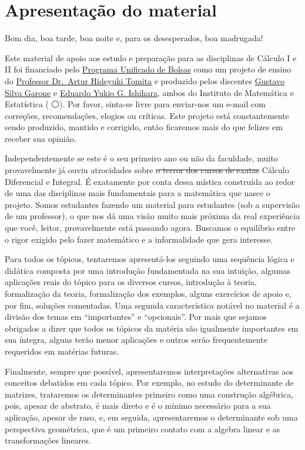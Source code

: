 \documentclass[
  portuguese,
  letterpaper,
  DIV=11,
  numbers=noendperiod]{scrreport}
\begin{document}
\section{Apresentação do material}\label{apresentauxe7uxe3o-do-material}

Bom dia, boa tarde, boa noite e, para os desesperados, boa madrugada! 👋

Este material de apoio aos estudo e preparação para as disciplinas de
Cálculo I e II foi financiado pelo
\href{https://prip.usp.br/pub/}{Programa Unificado de Bolsas} como um
projeto de ensino do \href{https://www.ime.usp.br/~tomita/}{Professor
Dr.~Artur Hideyuki Tomita} e produzido pelos discentes
\href{gustavo.garone@usp.br}{Gustavo Silva Garone} e
\href{eduardoyukio.ishihara@usp.br}{Eduardo Yukio G. Ishihara}, ambos do
Instituto de Matemática e Estatística (🔴⚪). Por favor, sinta-se livre
para enviar-nos um e-mail com correções, recomendações, elogios ou
críticas. Este projeto está constantemente sendo produzido, mantido e
corrigido, então ficaremos mais do que felizes em receber sua opinião.

Independentemente se este é o seu primeiro ano ou não da faculdade,
muito provavelmente já ouviu atrocidades sobre \st{o terror dos cursos
de exatas} Cálculo Diferencial e Integral. É exatamente por conta dessa
mística construída ao redor de uma das disciplinas mais fundamentais
para a matemática que nasce o projeto. Somos estudantes fazendo um
material para estudantes (sob a supervisão de um professor), o que nos
dá uma visão muito mais próxima da real experiência que você, leitor,
provavelmente está passando agora. Buscamos o equilíbrio entre o rigor
exigido pelo fazer matemático e a informalidade que gera interesse.

Para todos os tópicos, tentaremos apresentá-los seguindo uma sequência
lógica e didática composta por uma introdução fundamentada na sua
intuição, algumas aplicações reais do tópico para os diversos cursos,
introdução à teoria, formalização da teoria, formalização dos exemplos,
alguns exercícios de apoio e, por fim, soluções comentadas. Uma segunda
característica notável no material é a divisão dos temas em
``importantes'' e ``opcionais''. Por mais que sejamos obrigados a dizer
que todos os tópicos da matéria são igualmente importantes em sua
íntegra, alguns terão menor aplicações e outros serão frequentemente
requeridos em matérias futuras.

Finalmente, sempre que possível, apresentaremos interpretações
alternativas aos conceitos debatidos em cada tópico. Por exemplo, no
estudo do determinante de matrizes, trataremos os determinantes primeiro
como uma construção algébrica, pois, apesar de abstrato, é mais direto e
é o mínimo necessário para a sua aplicação, apesar de raso, e, em
seguida, apresentaremos o determinante sob uma perspectiva geométrica,
que é um primeiro contato com a algebra linear e as transformações
lineares.
\end{document}
